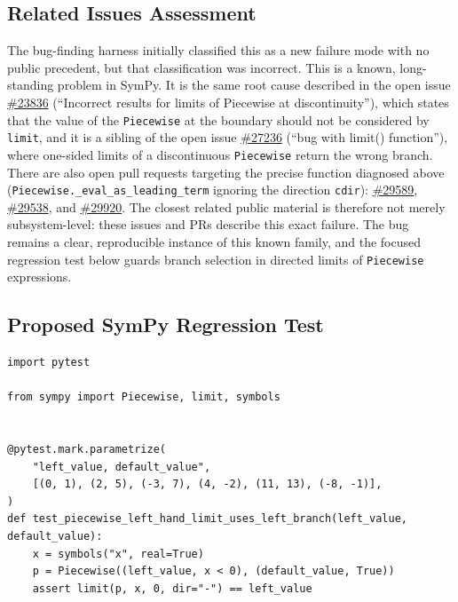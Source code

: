 \documentclass[11pt]{article}
\begin{document}
\subsection{Related Issues Assessment}

The bug-finding harness initially classified this as a new failure mode with no
public precedent, but that classification was incorrect.  This is a known,
long-standing problem in SymPy.  It is the same root cause described in the open
issue \href{https://github.com/sympy/sympy/issues/23836}{\#23836} (``Incorrect
results for limits of Piecewise at discontinuity''), which states that the value
of the \texttt{Piecewise} at the boundary should not be considered by
\texttt{limit}, and it is a sibling of the open issue
\href{https://github.com/sympy/sympy/issues/27236}{\#27236} (``bug with limit()
function''), where one-sided limits of a discontinuous \texttt{Piecewise} return
the wrong branch.  There are also open pull requests targeting the precise
function diagnosed above (\texttt{Piecewise.\_eval\_as\_leading\_term} ignoring
the direction \texttt{cdir}):
\href{https://github.com/sympy/sympy/pull/29589}{\#29589},
\href{https://github.com/sympy/sympy/pull/29538}{\#29538}, and
\href{https://github.com/sympy/sympy/pull/29920}{\#29920}.  The closest related
public material is therefore not merely subsystem-level: these issues and PRs
describe this exact failure.  The bug remains a clear, reproducible instance of
this known family, and the focused regression test below guards branch selection
in directed limits of \texttt{Piecewise} expressions.

\subsection{Proposed SymPy Regression Test}

\medskip

\begin{lstlisting}[style=bugpython]
import pytest

from sympy import Piecewise, limit, symbols


@pytest.mark.parametrize(
    "left_value, default_value",
    [(0, 1), (2, 5), (-3, 7), (4, -2), (11, 13), (-8, -1)],
)
def test_piecewise_left_hand_limit_uses_left_branch(left_value, default_value):
    x = symbols("x", real=True)
    p = Piecewise((left_value, x < 0), (default_value, True))
    assert limit(p, x, 0, dir="-") == left_value
\end{lstlisting}
\end{document}
